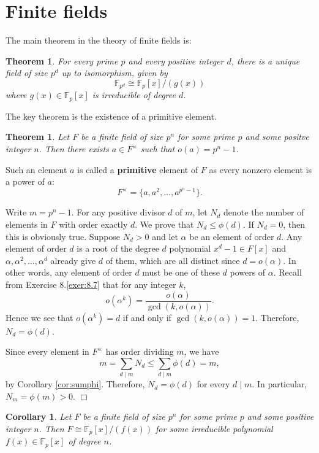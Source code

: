 \documentclass{article}
\def\F{{\mathbb F}}
\def\F{{\mathbb F}}
\newtheorem{theorem}[subsection]{Theorem}
\newtheorem{cor}[subsection]{Corollary}
\newenvironment{proof}{\noindent {\bf Proof:}}{$\Box$ \vspace{2 ex}}
\begin{document}
\section{Finite fields}

The main theorem in the theory of finite fields is:
\begin{theorem}
    For every prime $p$ and every positive integer $d$, there is a unique field of size $p^d$ up to isomorphism, given by $$\F_{p^d}\cong\F_p[x]/(g(x))$$
    where $g(x)\in\F_p[x]$ is irreducible of degree $d$.
\end{theorem}

The key theorem is the existence of a primitive element.

\begin{theorem}
    Let $F$ be a finite field of size $p^n$ for some prime $p$ and some positve integer $n$. Then there exists $a\in F^\times$ such that $o(a) = p^n - 1$.
\end{theorem}
Such an element $a$ is called a \textbf{primitive} element of $F$ as every nonzero element is a power of $a$:
$$F^\times = \{a,a^2,\ldots,a^{p^n - 1}\}.$$

\begin{proof}
    Write $m = p^n - 1$. For any positive divisor $d$ of $m$, let $N_d$ denote the number of elements in $F$ with order exactly $d$. We prove that $N_d\leq\phi(d)$. If $N_d = 0$, then this is obviously true. Suppose $N_d > 0$ and let $\alpha$ be an element of order $d$. Any element of order $d$ is a root of the degree $d$ polynomial $x^d - 1\in F[x]$ and $\alpha,\alpha^2,\ldots,\alpha^{d}$ already give $d$ of them, which are all distinct since $d = o(\alpha)$. In other words, any element of order $d$ must be one of these $d$ powers of $\alpha$. Recall from Exercise 8.\ref{exer:8.7} that for any integer $k$, $$o(\alpha^k) = \frac{o(\alpha)}{\gcd(k, o(\alpha))}.$$ Hence we see that $o(\alpha^k) = d$ if and only if $\gcd(k, o(\alpha)) = 1$. Therefore, $N_d = \phi(d)$. 

    Since every element in $F^\times$ has order dividing $m$, we have
    $$m = \sum_{d\mid m}N_d \leq \sum_{d\mid m}\phi(d) = m,$$
    by Corollary \ref{cor:sumphi}. Therefore, $N_d = \phi(d)$ for every $d\mid m$. In particular, $N_m = \phi(m) > 0$.
\end{proof}



\begin{cor}
    Let $F$ be a finite field of size $p^n$ for some prime $p$ and some positive integer $n$. Then $F\cong \F_p[x]/(f(x))$ for some irreducible polynomial $f(x)\in\F_p[x]$ of degree $n$.
\end{cor}
\end{document}

